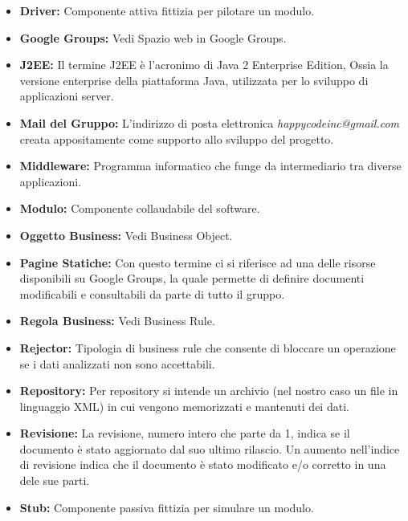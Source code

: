 \documentclass[11pt,titlepage,a4paper]{report}
\begin{document}
\begin{itemize}
\item{\textbf{Driver:}
Componente attiva fittizia per pilotare un modulo.}

\item{\textbf{Google Groups:}
Vedi Spazio web in Google Groups. }

\item{\textbf{J2EE:}
Il termine J2EE \`e l'acronimo di Java 2 Enterprise Edition, Ossia la versione enterprise della piattaforma Java, utilizzata per lo sviluppo di applicazioni server.}

\item{\textbf{Mail del Gruppo:}
L'indirizzo di posta elettronica \textit{happycodeinc@gmail.com} creata appositamente come supporto allo sviluppo del progetto.}

\item{\textbf{Middleware:}
Programma informatico che funge da intermediario tra diverse applicazioni.}

\item{\textbf{Modulo:}
Componente collaudabile del software.}

\item{\textbf{Oggetto Business:}
Vedi Business Object.}

\item{\textbf{Pagine Statiche:}
Con questo termine ci si riferisce ad una delle risorse disponibili su Google Groups,  la quale permette di definire documenti modificabili e consultabili da parte di tutto il gruppo.}

\item{\textbf{Regola Business:}
Vedi Business Rule.}

\item{\textbf{Rejector:}
Tipologia di business rule che consente di bloccare un operazione se i dati analizzati non sono accettabili.}
 
\item{\textbf{Repository:}
Per repository si intende un archivio (nel nostro caso un file in linguaggio XML) in cui vengono memorizzati e mantenuti dei dati.}

\item{\textbf{Revisione:}
La revisione, numero intero che parte da 1, indica se il documento \`e stato aggiornato dal suo ultimo rilascio. Un aumento nell'indice di revisione indica che il documento \`e stato modificato e/o corretto in una dele sue parti}.

\item{\textbf{Stub:}
Componente passiva fittizia per simulare un modulo.}


\end{itemize}
\end{document}
